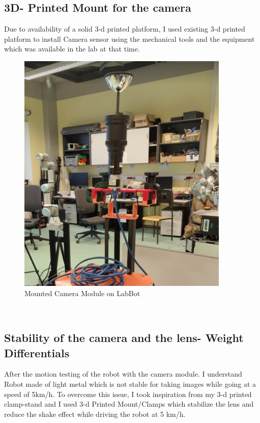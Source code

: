 \documentclass[11pt, a4paper, openany]{book}
\begin{document}
 \subsection{3D- Printed Mount for the camera }
 Due to availability of a solid 3-d printed platform, I used existing 3-d printed platform to install Camera sensor using the mechanical tools and the equipment which was available in the lab at that time.
\begin{figure}[H]
    \centering
    \includegraphics[scale=0.8]{Labbot&ele/3-d.png}
    \caption{Mounted Camera Module on LabBot}
    \label{fig:Platform} 
\end{figure}\

\subsection{Stability of the camera and the lens- Weight Differentials} 
After the motion testing of the robot with the camera module. I understand Robot made of light metal which is not stable for taking images while going at a speed of 5km/h. To overcome this issue, I took inspiration from my 3-d printed clamp-stand and I used 3-d Printed Mount/Clamps which stabilize the lens and reduce the shake effect while driving the robot at 5 km/h.
\end{document}
